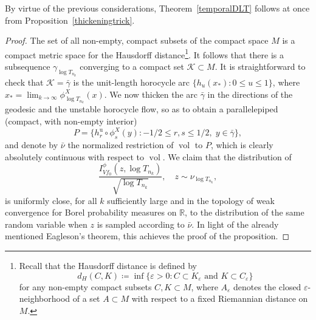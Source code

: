 \documentclass[10pt]{amsart}
\newcommand \R{\mathbb{R}}
\DeclareMathOperator{\vol}{vol}
\theoremstyle{definition}
\begin{document}
\begin{appendix}
By virtue of the previous considerations, Theorem~\ref{temporalDLT} follows at once from Proposition~\ref{thickeningtrick}.

\begin{proof}
The set of all non-empty, compact subsets of the compact space $M$ is a compact metric space for the Hausdorff distance\footnote{Recall that the Hausdorff distance is defined by
\begin{equation*}
d_H(C,K)\coloneqq\inf\{\varepsilon >0:C\subset K_{\varepsilon} \text{ and }K\subset C_{\varepsilon} \}
\end{equation*}
for any non-empty compact subsets $C,K\subset M$, where $A_{\varepsilon }$ denotes the closed $\varepsilon $-neighborhood of a set $A\subset M$ with respect to a fixed Riemannian distance on $M$.}. It follows that there is a subsequence $\gamma_{\log{T_{n_k}}}$ converging to a compact set $\mathcal{K}\subset M$. It is straightforward to check that $\mathcal{K}=\bar{\gamma}$ is the unit-length horocycle arc $\{h_{u}(x_{*}):0\leq u\leq 1 \}$, where $x_*=\lim_{k\to\infty}\phi^{X}_{\log{T_{n_k}}}(x)$.
We now thicken the arc $\bar{\gamma}$ in the directions of the geodesic and the unstable horocycle flow, so as to obtain a parallelepiped (compact, with non-empty interior)
\begin{equation}
\label{parallelepiped}
P=\{h^{\mathrm{u}}_{r}\circ \phi^{X}_s (y):-1/2\leq r,s\leq 1/2,\;y\in \bar{\gamma} \},
\end{equation}
and denote by $\bar{\nu}$ the normalized restriction of $\vol$ to $P$, which is clearly absolutely continuous with respect to $\vol$. We claim that the distribution of
\[
\frac{I_{Vf_0}^{\phi}(z,\log{T_{n_k}})}{\sqrt{\log{T_{n_k}}}},\quad z\sim \nu_{\log{T_{n_k}}},
\]
is uniformly close, for all $k$ sufficiently large and in the topology of weak convergence for Borel probability measures on $\R$, to the distribution of the same random variable when $z$ is sampled according to $\bar{\nu}$. In light of the already mentioned Eagleson's theorem, this achieves the proof of the proposition.


\end{proof}
\end{appendix}
\end{document}

